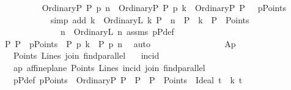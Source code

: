 \begin{isabellebody}
\isanewline
\ \ \ \ \ \ \ \ \isamarkupfalse%
\ {\isachardoublequoteopen}{\isacharparenleft}{\kern0pt}OrdinaryP\ P{\isacharparenright}{\kern0pt}\ p{\isasymlhd}\ n\ {\isasymand}\ {\isacharparenleft}{\kern0pt}OrdinaryP\ P{\isacharparenright}{\kern0pt}\ p{\isasymlhd}\ k\ {\isasymand}\ {\isacharparenleft}{\kern0pt}OrdinaryP\ P{\isacharparenright}{\kern0pt}\ {\isasymin}\ \ pPoints{\isachardoublequoteclose}\ \isanewline
\ \ \ \ \ \ \ \ \ \ \isamarkupfalse%
\ {\isacharparenleft}{\kern0pt}simp\ add{\isacharcolon}{\kern0pt}\ {\isacartoucheopen}k\ {\isacharequal}{\kern0pt}\ OrdinaryL\ k{}{\isacartoucheclose}\ {\isacartoucheopen}P\ {\isasymlhd}\ n{}\ {\isasymand}\ P\ {\isasymlhd}\ k{}\ {\isasymand}\ P\ {\isasymin}\ Points{\isacartoucheclose}\ \isanewline
\ \ \ \ \ \ \ \ \ \ \ \ \ \ {\isacartoucheopen}n\ {\isacharequal}{\kern0pt}\ OrdinaryL\ n{}{\isacartoucheclose}\ assms{\isacharparenleft}{\kern0pt}{}{\isacharparenright}{\kern0pt}\ pPdef{\isacharparenright}{\kern0pt}\isanewline
\ \ \ \ \ \ \ \ \isamarkupfalse%
\ \isamarkupfalse%
\ {\isachardoublequoteopen}{\isasymexists}P{\isachardot}{\kern0pt}\ P\ {\isasymin}\ pPoints\ {\isasymand}\ P\ p{\isasymlhd}\ k\ {\isasymand}\ P\ p{\isasymlhd}\ n{\isachardoublequoteclose}\ \isamarkupfalse%
\ auto\isanewline
\ \ \ \ \ \ \isamarkupfalse%
\isanewline
\ \ \ \ \isamarkupfalse%
\isanewline
\ \ \isamarkupfalse%
\isanewline
{}\isamarkupfalse%
%
\endisatagproof
{\isafoldproof}%
%
\isadelimproof
\ \isanewline
%
\endisadelimproof
\isanewline
{}\isamarkupfalse%
\ Ap{}{\isacharcolon}{\kern0pt}\isanewline
\ \ \ Points\ Lines\ join\ find{\isacharunderscore}{\kern0pt}parallel\isanewline
\ \ \ incid\ {\isacharparenleft}{\kern0pt}\ {\isachardoublequoteopen}{\isasymlhd}{\isachardoublequoteclose}\ {}{}{\isacharparenright}{\kern0pt}\isanewline
\ \ \ ap{\isacharcolon}{\kern0pt}\ {\isachardoublequoteopen}affine{\isacharunderscore}{\kern0pt}plane\ Points\ Lines\ incid\ join\ find{\isacharunderscore}{\kern0pt}parallel{\isachardoublequoteclose}\isanewline
\ \ \ pPdef{\isacharcolon}{\kern0pt}\ {\isachardoublequoteopen}pPoints\ {\isasymequiv}\ {\isacharbraceleft}{\kern0pt}OrdinaryP\ P\ {\isacharbar}{\kern0pt}\ P\ {\isachardot}{\kern0pt}\ {\isacharparenleft}{\kern0pt}P\ {\isasymin}\ Points{\isacharparenright}{\kern0pt}{\isacharbraceright}{\kern0pt}\ {\isasymunion}\ {\isacharbraceleft}{\kern0pt}Ideal\ t\ {\isacharbar}{\kern0pt}\ k\ t\ {\isachardot}{\kern0pt}\ \isanewline

\end{isabellebody}
